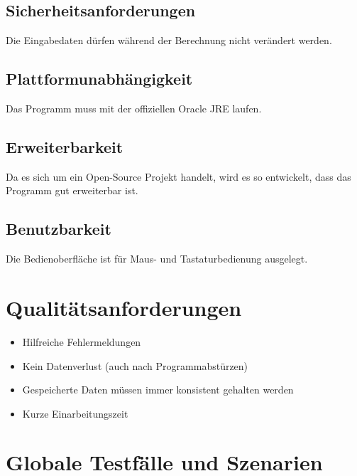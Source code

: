 \documentclass[10pt,a4paper]{article}
\begin{document}
\subsection{Sicherheitsanforderungen}
Die Eingabedaten dürfen während der Berechnung nicht verändert werden.

\subsection{Plattformunabhängigkeit}
Das Programm muss mit der offiziellen Oracle JRE laufen.

\subsection{Erweiterbarkeit}
Da es sich um ein Open-Source Projekt handelt, wird es so entwickelt, dass das Programm gut erweiterbar ist.

\subsection{Benutzbarkeit}
Die Bedienoberfläche ist für Maus- und Tastaturbedienung ausgelegt.

\section{Qualitätsanforderungen}
\begin{itemize}
	\item Hilfreiche Fehlermeldungen
	\item Kein Datenverlust (auch nach Programmabstürzen)
	\item Gespeicherte Daten müssen immer konsistent gehalten werden
	\item Kurze Einarbeitungszeit
\end{itemize}
\newpage
\section{Globale Testfälle und Szenarien}
\end{document}
